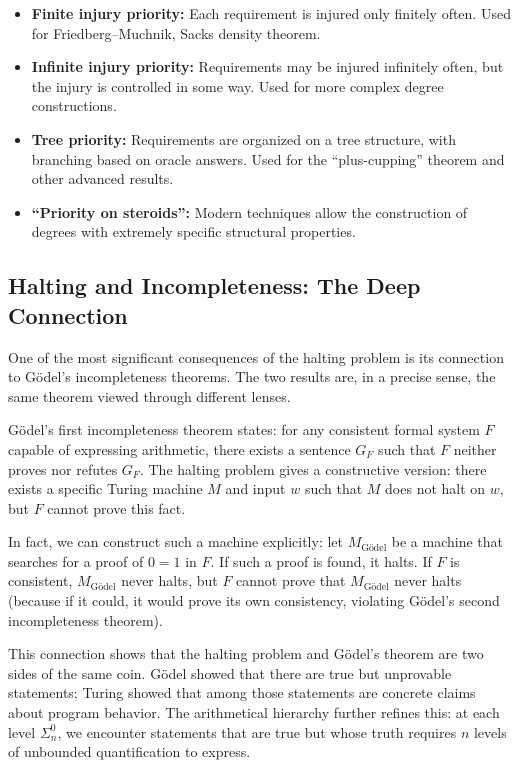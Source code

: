 \begin{itemize}
\item \textbf{Finite injury priority:} Each requirement is injured only finitely often. Used for Friedberg--Muchnik, Sacks density theorem.
\item \textbf{Infinite injury priority:} Requirements may be injured infinitely often, but the injury is controlled in some way. Used for more complex degree constructions.
\item \textbf{Tree priority:} Requirements are organized on a tree structure, with branching based on oracle answers. Used for the ``plus-cupping'' theorem and other advanced results.
\item \textbf{``Priority on steroids'':} Modern techniques allow the construction of degrees with extremely specific structural properties.
\end{itemize}

\subsection*{Halting and Incompleteness: The Deep Connection}

One of the most significant consequences of the halting problem is its connection to G\"odel's incompleteness theorems. The two results are, in a precise sense, the same theorem viewed through different lenses.

G\"odel's first incompleteness theorem states: for any consistent formal system $F$ capable of expressing arithmetic, there exists a sentence $G_F$ such that $F$ neither proves nor refutes $G_F$. The halting problem gives a constructive version: there exists a specific Turing machine $M$ and input $w$ such that $M$ does not halt on $w$, but $F$ cannot prove this fact.

In fact, we can construct such a machine explicitly: let $M_{\text{G\"odel}}$ be a machine that searches for a proof of $0 = 1$ in $F$. If such a proof is found, it halts. If $F$ is consistent, $M_{\text{G\"odel}}$ never halts, but $F$ cannot prove that $M_{\text{G\"odel}}$ never halts (because if it could, it would prove its own consistency, violating G\"odel's second incompleteness theorem).

This connection shows that the halting problem and G\"odel's theorem are two sides of the same coin. G\"odel showed that there are true but unprovable statements; Turing showed that among those statements are concrete claims about program behavior. The arithmetical hierarchy further refines this: at each level $\Sigma^0_n$, we encounter statements that are true but whose truth requires $n$ levels of unbounded quantification to express.

